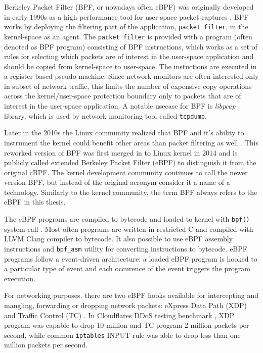 \documentclass[english, 12pt, a4paper, sci, utf8, a-2b, online]{aaltothesis}
\begin{document}
Berkeley Packet Filter (BPF, or nowadays often cBPF) was originally developed in early 1990s as a high-performance tool for user-space packet captures \cite{mccanne1993bsd}. BPF works by deploying the filtering part of the application, \texttt{packet filter}, in the kernel-space as an agent. The \texttt{packet filter} is provided with a program (often denoted as BPF program) consisting of BPF instructions, which works as a set of rules for selecting which packets are of interest in the user-space application and should be copied from kernel-space to user-space. The instuctions are executed in a register-based pseudo machine. Since network monitors are often interested only in subset of network traffic, this limits the number of expensive copy operations across the kernel/user-space protection boundary only to packets that are of interest in the user-space application. A notable usecase for BPF is \textit{libpcap} library, which is used by network monitoring tool called \texttt{tcpdump}.

Later in the 2010s the Linux community realized that BPF and it's ability to instrument the kernel could benefit other areas than packet filtering as well \cite{vieira2020fast}. This reworked version of BPF was first merged in to Linux kernel in 2014 and is publicly called extended Berkeley Packet Filter (eBPF) to distinguish it from the original cBPF. The kernel development community continues to call the newer version BPF, but instead of the original acronym consider it a name of a technology. Similarly to the kernel community, the term BPF always refers to the eBPF in this thesis.

The eBPF programs are compiled to bytecode and loaded to kernel with \texttt{bpf()} system call \cite{miano2021framework}. Most often programs are written in restricted C and compiled with LLVM Clang compiler to bytecode. It also possible to use eBPF assembly instructions and \texttt{bpf\_asm} utility for converting instructions to bytecode. eBPF programs follow a event-driven architecture: a loaded eBPF program is hooked to a particular type of event and each occurence of the event triggers the program execution.

For networking purposes, there are two eBPF hooks available for intercepting and mangling, forwarding or dropping network packets: eXpress Data Path (XDP) and Traffic Control (TC) \cite{miano2021framework}. In Cloudflares DDoS testing benchmark \cite{cloudflare-xdp}, XDP program was capable to drop 10 million and TC program 2 million packets per second, while common \texttt{iptables} INPUT rule was able to drop less than one million packets per second.
\end{document}
